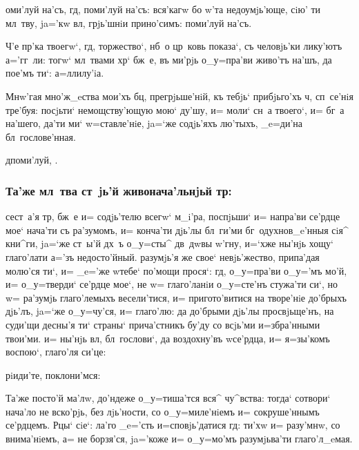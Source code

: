 \documentclass[12pt,a6paper,twoside,dvips,civil=antiqua,cs=pochaev]{hipbook}
\begin{document}
оми'луй на'съ, гд, поми'луй на'съ: вся'\-кагw бо w'та
недоумjь'юще, сiю' ти мл~тву, ja='кw вл, грjь'шнiи прино'симъ:
поми'луй на'съ.

 Ч'е пр'ка твоегw`, гд, торжество`,
нб~о цр~ковь показа`, съ человjь'ки ли\-ку'\-ютъ а='гг~ли: тогw`
мл~твами хр` бж~е, въ ми'рjь о_у=пра'ви живо'тъ на'шъ, да пое'мъ
ти`: а=ллилу'iа.

 Мнw'гая мно'ж_eства мои'хъ бц,
прегрjьше'нiй, къ тебjь` прибjьго'хъ ч, сп~се'\-нiя тре'\-буя:
посjьти` не\-мощ\-ст\-ву'\-ю\-щую мою` ду'шу, и= моли` сн~а твоего`,
и= бг~а на'\-ше\-го, да'ти ми` w=став\-ле'\-нiе, ja=`же содjь'яхъ
лю'\-тыхъ, _e=ди'на бл~гослове'нная.

\baselineskip
\centerline{д поми'луй, .}
\baselineskip

\centerline{}

\subsubsection{Та'же мл~тва ст~jь'й живонача'льнjьй тр:}

сест~а'я тр, бж~е и= содjь'телю всегw` м_i'\-ра, поспjьши`
и= напра'ви се'рдце мое` нача'ти съ ра'\-зу\-момъ, и= конча'ти дjь'лы
бл~ги'ми бг~о\-духнов_e'нныя сiя^ кни^ги, ja=`же ст~ы'й дх~ъ
о_у=с\-ты^ дв~дwвы w'гну, и=`хже ны'нjь хощу` гла\-го'\-ла\-ти
а='зъ недосто'йный. разумjь'я же свое` невjь'жество, припа'дая молю'ся
ти`, и= _e='же w\т тебе` по'мощи прося`: гд, о_у=пра'ви о_у='мъ
мо'й, и= о_у=тверди` се'рдце мое`, не w= гла\-го'\-ла\-нiи о_у=сте'нъ
стужа'ти си`, но w= ра'\-зумjь гла\-го'\-ле\-мыхъ весели'тися, и=
при\-го\-то'\-ви\-ти\-ся на творе'нiе до'брыхъ дjь'лъ, ja=`же
о_у=чу'ся, и= глаго'лю: да до'брыми дjь'лы просвjьще'нъ, на суди'щи
десны'я ти` страны` при\-ча'ст\-никъ бу'\-ду со всjь'ми и=збра'нными
твои'ми. и= ны'нjь вл, бл~гослови`, да воздохну'въ w\т се'рдца, и=
я=зы'комъ воспою`, глаго'ля си'це:

\begin{center}
  рiиди'те, поклони'мся: 
\end{center}

{\small \color[named]{Red} Та'же посто'й ма'лw, до'ндеже о_у=тиша'тся
  вся^ чу^вст\-ва: тогда` сотвори` нача'ло не вско'рjь, без\ъ
  лjь'ности, со о_у=миле'нiемъ и= сокруше'ннымъ се'рдцемъ. Рцы` сiе`:
  {\color[named]{Black} ла'го _e='сть и=сповjь'датися
    гд:} ти'хw и= разу'мнw, со внима'нiемъ, а= не борзя'ся,
  ja='коже и= о_у=мо'мъ разумjьва'ти гла\-го'\-л_e\-мая.}
\end{document}
